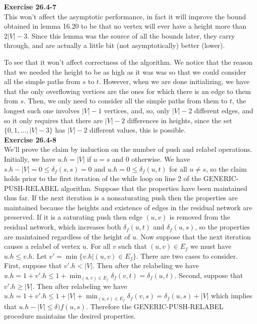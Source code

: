 \documentclass{article}
\begin{document}
\noindent\textbf{Exercise 26.4-7}\\

This won't affect the asymptotic performance, in fact it will improve the bound obtained in lemma 16.20 to be that no vertex will ever have a height more than $2|V|-3$. Since this lemma was the source of all the bounds later, they carry through, and are actually a little bit (not asymptotically) better (lower).

To see that it won't affect correctness of the algorithm. We notice that the reason that we needed the height to be as high as it was was so that we could consider all the simple paths from $s$ to $t$. However, when we are done initializing, we have that the only overflowing vertices are the ones for which there is an edge to them from $s$. Then, we only need to consider all the simple paths from them to $t$, the longest such one involves $|V|-1$ vertices, and, so, only $|V|-2$ different edges, and so it only requires that there are $|V|-2$ differences in heights, since the set $\{0,1,\ldots,|V|-3\}$ has $|V|-2$ different values, this is possible. \\


\noindent\textbf{Exercise 26.4-8}\\

We'll prove the claim by induction on the number of push and relabel operations.  Initially, we have $u.h = |V|$ if $u=s$ and 0 otherwise.  We have $s.h - |V| = 0 \leq \delta_f(s,s) = 0$ and $u.h = 0 \leq \delta_f(u,t)$ for all $u \neq s$, so the claim holds prior to the first iteration of the while loop on line 2 of the GENERIC-PUSH-RELABEL algorithm.  Suppose that the properties have been maintained thus far.  If the next iteration is a nonsaturating push then the properties are maintained because the heights and existence of edges in the residual network are preserved.  If it is a saturating push then edge $(u,v)$ is removed from the residual network, which increases both $\delta_f(u,t)$ and $\delta_f(u,s)$, so the properties are maintained regardless of the height of $u$.  Now suppose that the next iteration causes a relabel of vertex $u$.  For all $v$ such that $(u,v) \in E_f$ we must have $u.h \leq v.h$.  Let $v' = \min\{v.h | (u,v) \in E_f\}$.  There are two cases to consider.  First, suppose that $v'.h < |V|$.  Then after the relabeling we have $u.h = 1 + v'.h \leq 1 + \min_{(u,v) \in E_f} \delta_f(v,t) = \delta_f(u,t)$.  Second, suppose that $v'.h \geq |V|$.  Then after relabeling we have $u.h = 1+v'.h \leq 1 + |V| + \min_{(u,v) \in E_f} \delta_f(v,s) = \delta_f(u,s) + |V|$ which implies that $u.h - |V| \leq \delta)f(u,s)$.  Therefore the GENERIC-PUSH-RELABEL procedure maintains the desired properties. \\
\end{document}
